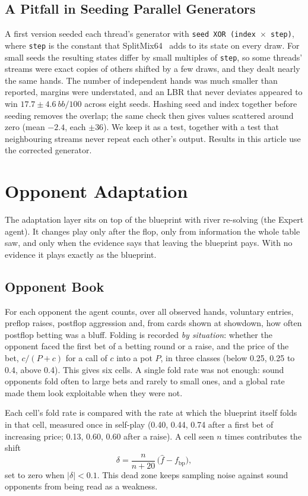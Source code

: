 \documentclass{ieeeaccess}
\newcommand{\bbh}{bb/100}
\begin{document}
\subsection{A Pitfall in Seeding Parallel Generators}
A first version seeded each thread's generator with \texttt{seed XOR (index $\times$ step)},
where \texttt{step} is the constant that SplitMix64~\cite{steele2014} adds to its state on every
draw. For small seeds the resulting states differ by small multiples of \texttt{step}, so some
threads' streams were exact copies of others shifted by a few draws, and they dealt nearly the
same hands. The number of independent hands was much smaller than reported, margins were
understated, and an LBR that never deviates appeared to win $17.7\pm4.6~\bbh$ across eight
seeds. Hashing seed and index together before seeding removes the overlap; the same check then
gives values scattered around zero (mean $-2.4$, each $\pm36$). We keep it as a test, together
with a test that neighbouring streams never repeat each other's output. Results in this article
use the corrected generator.

\section{Opponent Adaptation}
\label{sec:adaptation}
The adaptation layer sits on top of the blueprint with river re-solving (the Expert agent). It
changes play only after the flop, only from information the whole table saw, and only when the
evidence says that leaving the blueprint pays. With no evidence it plays exactly as the blueprint.

\subsection{Opponent Book}
For each opponent the agent counts, over all observed hands, voluntary entries, preflop raises,
postflop aggression and, from cards shown at showdown, how often postflop betting was a bluff.
Folding is recorded \emph{by situation}: whether the opponent faced the first bet of a betting
round or a raise, and the price of the bet, $c/(P+c)$ for a call of $c$ into a pot $P$, in three
classes (below 0.25, 0.25 to 0.4, above 0.4). This gives six cells. A single fold rate was not
enough: sound opponents fold often to large bets and rarely to small ones, and a global rate made
them look exploitable when they were not.

Each cell's fold rate is compared with the rate at which the blueprint itself folds in that cell,
measured once in self-play (0.40, 0.44, 0.74 after a first bet of increasing price; 0.13, 0.60,
0.60 after a raise). A cell seen $n$ times contributes the shift
\begin{equation}
\delta = \frac{n}{n+20}\,\big(\hat f - f_{\mathrm{bp}}\big),
\label{eq:shift}
\end{equation}
set to zero when $|\delta| < 0.1$. This dead zone keeps sampling noise against sound opponents
from being read as a weakness.
\end{document}
